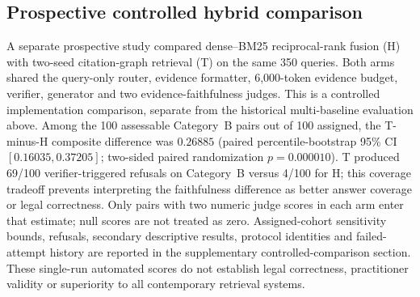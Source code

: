 \subsection{Prospective controlled hybrid comparison}
\label{subsec:matched-comparison}
A separate prospective study compared dense--BM25 reciprocal-rank fusion (H) with two-seed citation-graph retrieval (T) on the same 350 queries. Both arms shared the query-only router, evidence formatter, 6,000-token evidence budget, verifier, generator and two evidence-faithfulness judges. This is a controlled implementation comparison, separate from the historical multi-baseline evaluation above. Among the 100 assessable Category~B pairs out of 100 assigned, the T-minus-H composite difference was $0.26885$ (paired percentile-bootstrap 95\% CI $[0.16035, 0.37205]$; two-sided paired randomization $p=0.000010$). T produced 69/100 verifier-triggered refusals on Category~B versus 4/100 for H; this coverage tradeoff prevents interpreting the faithfulness difference as better answer coverage or legal correctness. Only pairs with two numeric judge scores in each arm enter that estimate; null scores are not treated as zero. Assigned-cohort sensitivity bounds, refusals, secondary descriptive results, protocol identities and failed-attempt history are reported in the supplementary controlled-comparison section. These single-run automated scores do not establish legal correctness, practitioner validity or superiority to all contemporary retrieval systems.
